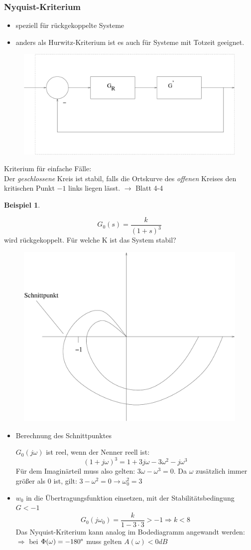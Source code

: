 \message{ !name(Mitschrieb_SysRegel.tex)}\documentclass[12pt,a4paper,ngerman]{scrartcl}
\newtheorem{bsp}{Beispiel}[section] %
\begin{document}
\subsubsection{Nyquist-Kriterium}

\begin{itemize}
\item speziell für rückgekoppelte Systeme
\item anders als Hurwitz-Kriterium ist es auch für Systeme mit Totzeit geeignet.
\end{itemize}

\begin{figure}[H]
\includegraphics[width=0.7\linewidth]{sysregel_nyquist}
\end{figure}
Kriterium für einfache Fälle:\\
Der \emph{geschlossene} Kreis ist stabil, falls die Ortskurve des \emph{offenen} Kreises den kritischen Punkt $-1$ links liegen lässt. $\rightarrow$ Blatt 4-4

\begin{bsp}
\end{bsp}
\[
G_0(s)=\frac{k}{(1+s)^3}
\]
wird rückgekoppelt. Für welche K ist das System stabil?
\begin{figure}[H]
  \centering
\includegraphics[width=.5\linewidth]{sysregel_bsp_4_3}  

\end{figure}
\begin{itemize}
\item Berechnung des Schnittpunktes

$G_0(j\omega)$ ist reel, wenn der Nenner reell ist:
\[
(1+j\omega)^3=1+3j\omega-3\omega^2-j\omega^3
\]
Für dem Imaginärteil muss also gelten: $3\omega-\omega^3=0$. Da $\omega$ zusätzlich immer größer als 0 ist, gilt: $3-\omega^2=0 \rightarrow \omega_0^2=3$
\item $w_0$ in die Übertragungsfunktion einsetzen, mit der Stabilitätsbedingung $G<-1$
\[
G_0(j\omega_0)=\frac{k}{1-3\cdot 3}>-1 \Rightarrow k<8
\] 
Das Nyquist-Kriterium kann analog im Bodediagramm angewandt werden:\\
$\Rightarrow$ bei $\Phi(\omega)=-180\degree$ muss gelten $A(\omega)<0dB$
\end{itemize}
\end{document}
